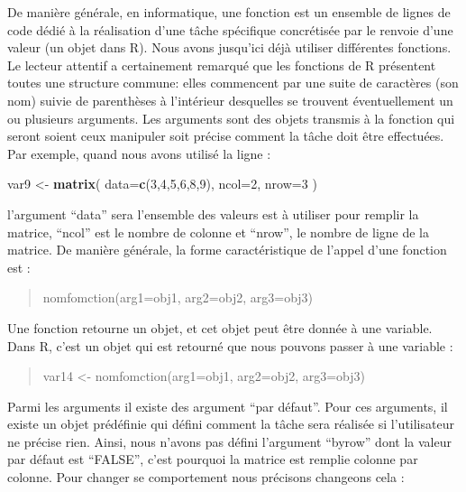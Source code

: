 \documentclass[]{article}
\newenvironment{Shaded}{\begin{snugshade}}{\end{snugshade}}
\newcommand{\DataTypeTok}[1]{\textcolor[rgb]{0.13,0.29,0.53}{#1}}
\newcommand{\DecValTok}[1]{\textcolor[rgb]{0.00,0.00,0.81}{#1}}
\newcommand{\KeywordTok}[1]{\textcolor[rgb]{0.13,0.29,0.53}{\textbf{#1}}}
\newcommand{\NormalTok}[1]{#1}
\newcommand{\StringTok}[1]{\textcolor[rgb]{0.31,0.60,0.02}{#1}}
\begin{document}
De manière générale, en informatique, une fonction est un ensemble de lignes de code dédié à la réalisation d'une tâche spécifique concrétisée par le renvoie d'une valeur (un objet dans R). Nous avons jusqu'ici déjà utiliser différentes fonctions. Le lecteur attentif a certainement remarqué que les fonctions de R présentent toutes une structure commune: elles commencent par une suite de caractères (son nom) suivie de parenthèses à l'intérieur desquelles se trouvent éventuellement un ou plusieurs arguments. Les arguments sont des objets transmis à la fonction qui seront soient ceux manipuler soit précise comment la tâche doit être effectuées. Par exemple, quand nous avons utilisé la ligne :

\begin{Shaded}
\begin{Highlighting}[]
\NormalTok{var9 <-}\StringTok{ }\KeywordTok{matrix}\NormalTok{(}
  \DataTypeTok{data=}\KeywordTok{c}\NormalTok{(}\DecValTok{3}\NormalTok{,}\DecValTok{4}\NormalTok{,}\DecValTok{5}\NormalTok{,}\DecValTok{6}\NormalTok{,}\DecValTok{8}\NormalTok{,}\DecValTok{9}\NormalTok{),}
  \DataTypeTok{ncol=}\DecValTok{2}\NormalTok{,}
  \DataTypeTok{nrow=}\DecValTok{3}
\NormalTok{  )}
\end{Highlighting}
\end{Shaded}

l'argument ``data'' sera l'ensemble des valeurs est à utiliser pour remplir la matrice, ``ncol'' est le nombre de colonne et ``nrow'', le nombre de ligne de la matrice. De manière générale, la forme caractéristique de l'appel d'une fonction est :

\begin{quote}
nomfomction(arg1=obj1, arg2=obj2, arg3=obj3)
\end{quote}

Une fonction retourne un objet, et cet objet peut être donnée à une variable.
Dans R, c'est un objet qui est retourné que nous pouvons passer à une variable :

\begin{quote}
var14 \textless{}- nomfomction(arg1=obj1, arg2=obj2, arg3=obj3)
\end{quote}

Parmi les arguments il existe des argument ``par défaut''. Pour ces arguments, il existe un objet prédéfinie qui défini comment la tâche sera réalisée si l'utilisateur ne précise rien. Ainsi, nous n'avons pas défini l'argument ``byrow'' dont la valeur par défaut est ``FALSE'', c'est pourquoi la matrice est remplie colonne par colonne. Pour changer se comportement nous précisons changeons cela :
\end{document}
